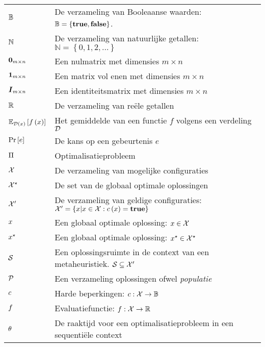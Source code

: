 \begin{flushleft}
  \renewcommand{\arraystretch}{1.1}
  \begin{tabularx}{\textwidth}{@{}p{18mm}X@{}}
    $\BoolSet$					& De verzameling van Booleaanse waarden: $\mathbb{B}=\left\{\mbox{\textbf{true}},\mbox{\textbf{false}}\right\}$. \\
    $\NatSet$					& De verzameling van natuurlijke getallen: $\mathbb{N}=\left\{0,1,2,\ldots\right\}$ \\
    $\zeromatrix[m\times n]$			& Een nulmatrix met dimensies $m\times n$\\
    $\onematrix[m\times n]$			& Een matrix vol enen met dimensies $m\times n$\\
    $\identitymatrix[m\times n]$		& Een identiteitsmatrix met dimensies $m\times n$\\
    $\RealSet$					& De verzameling van re\"ele getallen\\
    $\mean[\fun{\calD}{x}]{\fun{f}{x}}$	& Het gemiddelde van een functie $f$ volgens een verdeling $\calD$\\%
    $\Prob{e}$					& De kans op een gebeurtenis $e$\\
    $\OpProblem$				& Optimalisatieprobleem\\
    $\ConfigSet$				& De verzameling van mogelijke configuraties\\
    $\ConfigOpSet$				& De set van de globaal optimale oplossingen\\
    $\ConfigValSet$				& De verzameling van geldige configuraties: $\ConfigValSet=\accl{x|x\in\ConfigSet:\fun{c}{x}=\true{}}$\\
    $\sol$					& Een globaal optimale oplossing: $\sol\in\ConfigSet$\\
    $\bestSol$					& Een globaal optimale oplossing: $\xstar\in\ConfigOpSet$\\
    $\SolSet$					& Een oplossingsruimte in de context van een metaheuristiek. $\SolSet\subseteq\ConfigValSet$\\
    $\PopSet$					& Een verzameling oplossingen ofwel \emph{populatie}\\
    $\hcfun$					& Harde beperkingen: $\funsig{\hcfun}{\ConfigSet}{\BoolSet}$\\
    $\evalfun$					& Evaluatiefunctie: $\funsig{\evalfun}{\ConfigSet}{\RealSet}$\\
    $\hittime$					& De raaktijd voor een optimalisatieprobleem in een sequenti\"ele context\\

\end{tabularx}
\end{flushleft}
